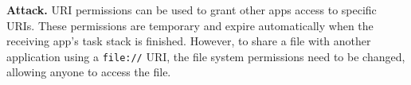 \begin{algorithm}[]
\SetAlgoLined
{}
\caption{}
\label{algorithm9}
\end{algorithm}

\textbf{Attack.} URI permissions can be used to grant other apps access to specific URIs. These permissions are temporary and expire automatically when the receiving app's task stack is finished. 
However, to share a file with another application using a \texttt{file://} URI, the file system permissions need to be changed, allowing anyone to access the file.

